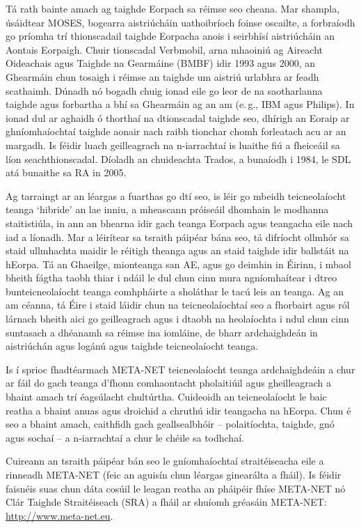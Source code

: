 \begin{multicols}{2}
Tá rath bainte amach ag taighde Eorpach sa réimse seo cheana. Mar shampla, úsáidtear MOSES, bogearra aistriúcháin uathoibríoch foinse oscailte, a forbraíodh go príomha trí thionscadail taighde Eorpacha anois i seirbhísí aistriúcháin an Aontais Eorpaigh. Chuir tionscadal Verbmobil, arna mhaoiniú ag Aireacht Oideachais agus Taighde na Gearmáine (BMBF) idir 1993 agus 2000, an Ghearmáin chun tosaigh i réimse an taighde um aistriú urlabhra ar feadh scathaimh. Dúnadh nó bogadh chuig ionad eile go leor de na saotharlanna taighde agus forbartha a bhí sa Ghearmáin ag an am (e.\,g., IBM agus Philips). In ionad dul ar aghaidh ó thorthaí na dtionscadal taighde seo, dhírigh an Eoraip ar ghníomhaíochtaí taighde aonair nach raibh tionchar chomh forleatach acu ar an margadh.  Is féidir luach geilleagrach na n-iarrachtaí is luaithe fiú a fheiceáil sa líon seachthionscadal. Díoladh an chuideachta Trados, a bunaíodh i 1984, le SDL atá bunaithe sa RA in 2005.

Ag tarraingt ar an léargas a fuarthas go dtí seo, is léir go mbeidh teicneolaíocht teanga ‘hibride’ an lae inniu, a mheascann próiseáil dhomhain le modhanna staitistiúla, in ann an bhearna idir gach teanga Eorpach agus teangacha eile nach iad a líonadh. Mar a léirítear sa tsraith páipéar bána seo, tá difríocht ollmhór sa staid ullmhachta maidir le réitigh theanga agus an staid taighde idir ballstáit na hEorpa. Tá an Ghaeilge, mionteanga san AE, agus go deimhin in Éirinn, i mbaol bheith fágtha taobh thiar i ndáil le dul chun cinn mura ngníomhaítear i dtreo bunteicneolaíocht teanga comhpháirte a sholáthar le tacú leis an teanga. Ag an am céanna, tá Éire i staid láidir chun na teicneolaíochtaí seo a fhorbairt agus ról lárnach bheith aici go geilleagrach agus i dtaobh na heolaíochta i ndul chun cinn suntasach a dhéanamh sa réimse ina iomláine, de bharr ardchaighdeán in aistriúchán agus logánú agus taighde teicneolaíocht teanga. 

Is í sprioc fhadtéarmach META-NET teicneolaíocht teanga ardchaighdeáin a chur ar fáil do gach teanga d’fhonn comhaontacht pholaitiúil agus gheilleagrach a bhaint amach trí éagsúlacht chultúrtha. Cuideoidh an teicneolaíocht le baic reatha a bhaint anuas agus droichid a chruthú idir teangacha na hEorpa. Chun é seo a bhaint amach, caithfidh gach geallsealbhóir – polaitíochta, taighde, gnó agus sochaí – a n-iarrachtaí a chur le chéile sa todhchaí.
\columnbreak

Cuireann an tsraith páipéar bán seo le gníomhaíochtaí straitéiseacha eile a rinneadh META-NET (feic an aguisín chun léargas ginearálta a fháil). Is féidir faisnéis suas chun dáta cosúil le leagan reatha an pháipéir fhíse META-NET \cite{Meta1} nó Clár Taighde Straitéiseach (SRA) a fháil ar shuíomh gréasáin META-NET:  \url{http://www.meta-net.eu}.
\end{multicols}

